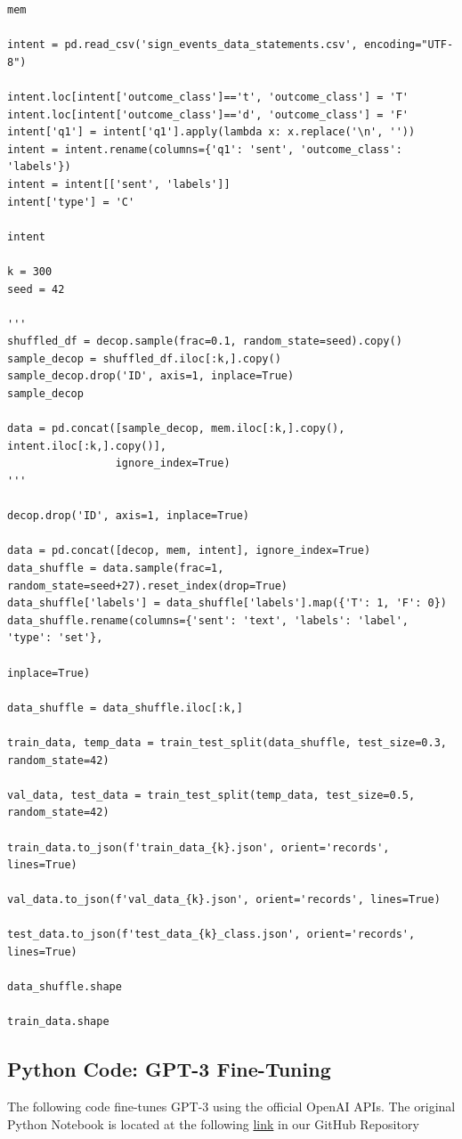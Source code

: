 \documentclass[10pt,twocolumn,letterpaper]{article}
\begin{document}
\begin{verbatim}
mem

intent = pd.read_csv('sign_events_data_statements.csv', encoding="UTF-8")

intent.loc[intent['outcome_class']=='t', 'outcome_class'] = 'T'
intent.loc[intent['outcome_class']=='d', 'outcome_class'] = 'F'
intent['q1'] = intent['q1'].apply(lambda x: x.replace('\n', ''))
intent = intent.rename(columns={'q1': 'sent', 'outcome_class': 'labels'})
intent = intent[['sent', 'labels']]
intent['type'] = 'C'

intent

k = 300
seed = 42

'''
shuffled_df = decop.sample(frac=0.1, random_state=seed).copy()
sample_decop = shuffled_df.iloc[:k,].copy()
sample_decop.drop('ID', axis=1, inplace=True)
sample_decop

data = pd.concat([sample_decop, mem.iloc[:k,].copy(), intent.iloc[:k,].copy()],
                 ignore_index=True)
'''

decop.drop('ID', axis=1, inplace=True)

data = pd.concat([decop, mem, intent], ignore_index=True)
data_shuffle = data.sample(frac=1, random_state=seed+27).reset_index(drop=True)
data_shuffle['labels'] = data_shuffle['labels'].map({'T': 1, 'F': 0})
data_shuffle.rename(columns={'sent': 'text', 'labels': 'label', 'type': 'set'}, 
                                                                        inplace=True)

data_shuffle = data_shuffle.iloc[:k,]

train_data, temp_data = train_test_split(data_shuffle, test_size=0.3, random_state=42)

val_data, test_data = train_test_split(temp_data, test_size=0.5, random_state=42)

train_data.to_json(f'train_data_{k}.json', orient='records', lines=True)

val_data.to_json(f'val_data_{k}.json', orient='records', lines=True)

test_data.to_json(f'test_data_{k}_class.json', orient='records', lines=True)

data_shuffle.shape

train_data.shape
\end{verbatim}

\subsection{Python Code: GPT-3 Fine-Tuning}

The following code fine-tunes GPT-3 using the official OpenAI APIs.
The original Python Notebook is located at the following \href{https://colab.research.google.com/github/TannerAGraves/GPT-LieDetection/blob/main/gpt3.5/API_scratch.ipynb}{link} in our GitHub Repository
\end{document}
